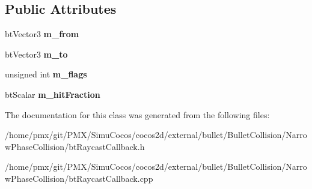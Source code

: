 \subsection*{Public Attributes}
\begin{DoxyCompactItemize}
\item 
\mbox{\label{classbtTriangleRaycastCallback_abeb58bc424f22dda0061939895c76339}} 
bt\+Vector3 {\bfseries m\+\_\+from}
\item 
\mbox{\label{classbtTriangleRaycastCallback_aa322a8ab074226440312548a7512e4bc}} 
bt\+Vector3 {\bfseries m\+\_\+to}
\item 
\mbox{\label{classbtTriangleRaycastCallback_a62a5d1ff4e30d29aa0de9cc8dcda8911}} 
unsigned int {\bfseries m\+\_\+flags}
\item 
\mbox{\label{classbtTriangleRaycastCallback_a3f105a17c84acb05a1ff5a0a3fa9e43a}} 
bt\+Scalar {\bfseries m\+\_\+hit\+Fraction}
\end{DoxyCompactItemize}


The documentation for this class was generated from the following files\+:\begin{DoxyCompactItemize}
\item 
/home/pmx/git/\+P\+M\+X/\+Simu\+Cocos/cocos2d/external/bullet/\+Bullet\+Collision/\+Narrow\+Phase\+Collision/bt\+Raycast\+Callback.\+h\item 
/home/pmx/git/\+P\+M\+X/\+Simu\+Cocos/cocos2d/external/bullet/\+Bullet\+Collision/\+Narrow\+Phase\+Collision/bt\+Raycast\+Callback.\+cpp\end{DoxyCompactItemize}
